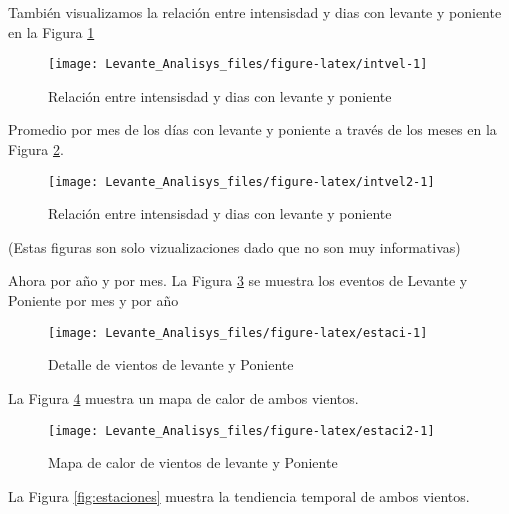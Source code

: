 \documentclass[
]{article}
\begin{document}
\newpage

También visualizamos la relación entre intensisdad y dias con levante y poniente en la Figura \ref{fig:intvel}

\begin{figure}

{\centering \texttt{[image: Levante\_Analisys\_files/figure-latex/intvel-1]} 

}

\caption{Relación entre intensisdad y dias con levante y poniente}\label{fig:intvel}
\end{figure}

Promedio por mes de los días con levante y poniente a través de los meses en la Figura \ref{fig:intvel2}.

\begin{figure}

{\centering \texttt{[image: Levante\_Analisys\_files/figure-latex/intvel2-1]} 

}

\caption{Relación entre intensisdad y dias con levante y poniente}\label{fig:intvel2}
\end{figure}

(Estas figuras son solo vizualizaciones dado que no son muy informativas)

\newpage

Ahora por año y por mes. La Figura \ref{fig:estaci} se muestra los eventos de Levante y Poniente por mes y por año

\begin{figure}

{\centering \texttt{[image: Levante\_Analisys\_files/figure-latex/estaci-1]} 

}

\caption{Detalle de vientos de levante y Poniente}\label{fig:estaci}
\end{figure}

La Figura \ref{fig:estaci2} muestra un mapa de calor de ambos vientos.

\begin{figure}

{\centering \texttt{[image: Levante\_Analisys\_files/figure-latex/estaci2-1]} 

}

\caption{Mapa de calor de vientos de levante y Poniente}\label{fig:estaci2}
\end{figure}

La Figura \ref{fig:estaciones} muestra la tendiencia temporal de ambos vientos.
\end{document}
